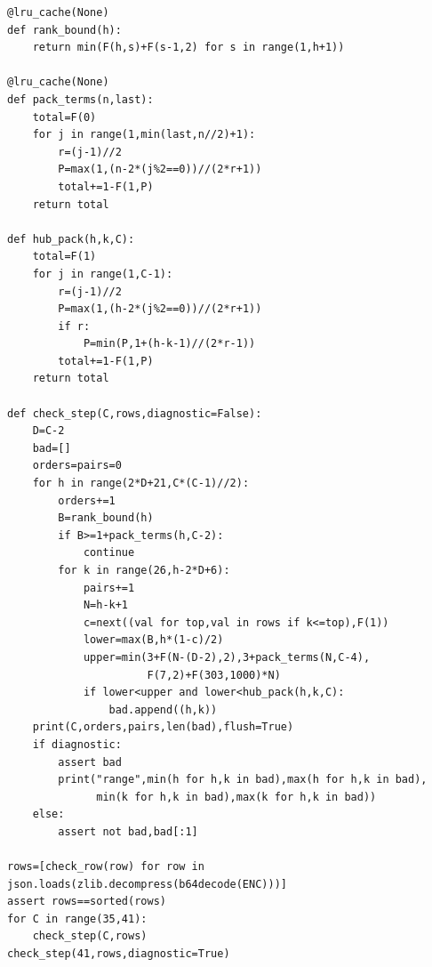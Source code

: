 \documentclass[11pt,a4paper]{article}
\begin{document}
\begin{Verbatim}[fontsize=\scriptsize]
@lru_cache(None)
def rank_bound(h):
    return min(F(h,s)+F(s-1,2) for s in range(1,h+1))

@lru_cache(None)
def pack_terms(n,last):
    total=F(0)
    for j in range(1,min(last,n//2)+1):
        r=(j-1)//2
        P=max(1,(n-2*(j%2==0))//(2*r+1))
        total+=1-F(1,P)
    return total

def hub_pack(h,k,C):
    total=F(1)
    for j in range(1,C-1):
        r=(j-1)//2
        P=max(1,(h-2*(j%2==0))//(2*r+1))
        if r:
            P=min(P,1+(h-k-1)//(2*r-1))
        total+=1-F(1,P)
    return total

def check_step(C,rows,diagnostic=False):
    D=C-2
    bad=[]
    orders=pairs=0
    for h in range(2*D+21,C*(C-1)//2):
        orders+=1
        B=rank_bound(h)
        if B>=1+pack_terms(h,C-2):
            continue
        for k in range(26,h-2*D+6):
            pairs+=1
            N=h-k+1
            c=next((val for top,val in rows if k<=top),F(1))
            lower=max(B,h*(1-c)/2)
            upper=min(3+F(N-(D-2),2),3+pack_terms(N,C-4),
                      F(7,2)+F(303,1000)*N)
            if lower<upper and lower<hub_pack(h,k,C):
                bad.append((h,k))
    print(C,orders,pairs,len(bad),flush=True)
    if diagnostic:
        assert bad
        print("range",min(h for h,k in bad),max(h for h,k in bad),
              min(k for h,k in bad),max(k for h,k in bad))
    else:
        assert not bad,bad[:1]

rows=[check_row(row) for row in json.loads(zlib.decompress(b64decode(ENC)))]
assert rows==sorted(rows)
for C in range(35,41):
    check_step(C,rows)
check_step(41,rows,diagnostic=True)
\end{Verbatim}
\end{document}
